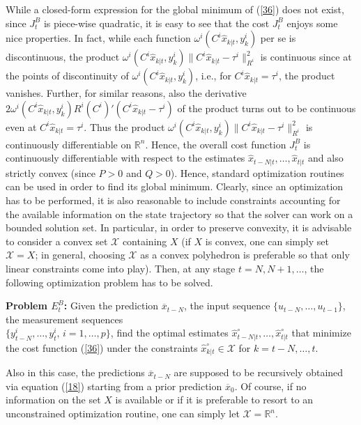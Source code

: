 \documentclass[11pt,journal,onecolumn]{IEEEtran}
\begin{document}
While a closed-form expression for the global minimum of (\ref{36}) does not exist, since $J_t^B$ is piece-wise quadratic, it is easy to see that the cost $J_t^B$ enjoys some nice properties. In fact, while each function $\omega^i \left( C^i \hat{x}_{k|t}, y_{k}^{i}\right)$ per se is discontinuous, the product $\omega^i \left( C^i \hat{x}_{k|t}, y_{k}^{i}\right)\| C^i \hat{x}_{k|t} - \tau^i \|^2_{R^i}$ is continuous since at the points of discontinuity of
$\omega^i \left( C^i \hat{x}_{k|t}, y_{k}^{i}\right)$, i.e., for $C^i \hat{x}_{k|t} = \tau^i$, the product vanishes. Further, for similar reasons, also the derivative $2 \omega^i \left( C^i \hat{x}_{k|t}, y_{k}^{i}\right) R^i (C^i )' ( C^i \hat{x}_{k|t} - \tau^i )$ of the product turns out to be continuous even at $C^i \hat{x}_{k|t} = \tau^i$.
Thus the product $\omega^i \left( C^i \hat{x}_{k|t}, y_{k}^{i}\right)\| C^i \hat{x}_{k|t} - \tau^i \|^2_{R^i}$ is continuously differentiable on $\mathbb R^n$. Hence, the overall cost function $J_t^B$ is continuously differentiable with respect to the estimates $\hat{x}_{t-N|t},\ldots,\hat{x}_{t|t}$ and also strictly convex (since $P>0$ and $Q>0$). Hence, standard optimization routines can be used in order to find its global minimum. Clearly, since an optimization has to be performed, it is also reasonable to include constraints accounting for the available information on the state trajectory so that the solver can work on a bounded solution set. In particular, in order to preserve convexity, it is advisable to consider a convex set $\mathcal X$ containing $X$ (if $X$ is convex, one can simply set $\mathcal X = X$; in general, choosing $\mathcal X$ as a convex polyhedron is preferable so that only linear constraints come into play). Then, at any stage $t=N,N+1,\ldots$, the following optimization problem has to be solved.  \vspace{.3cm}

\textbf{Problem $E_{t}^{B}$:} Given the prediction $\overline{x}_{t-N}$, the input sequence $\{ u_{t-N}, \ldots, u_{t-1} \}$, the measurement sequences \\
$\{ y^i_{t-N}, \ldots, y^i_t , \, i = 1, \ldots, p \}$, find the optimal estimates $\hat{x}^{\circ}_{t-N|t},\ldots,\hat{x}^{\circ}_{t|t}$ that minimize the cost function (\ref{36}) under the constraints $\hat{x}^{\circ}_{k|t} \in \mathcal X$ for $k= t-N , \ldots,t$.
\vspace{.3cm}

Also in this case, the predictions $\overline{x}_{t-N}$ are supposed to be recursively obtained via equation (\ref{18}) starting from a prior prediction $\overline x_0$. Of course, if no information on the set $X$ is available or if it is preferable to resort to an unconstrained optimization routine, one can simply let $\mathcal X = \mathbb R^n$.
\end{document}
